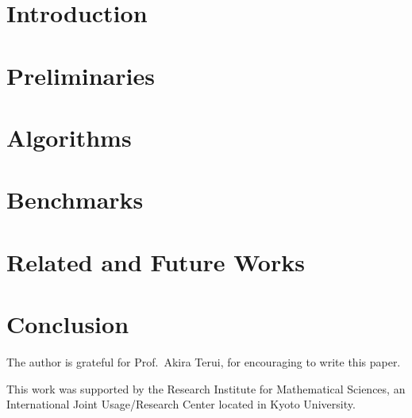 \documentclass[%
  sigconf,authorversion,screen]{acmart}
\begin{document}
\maketitle

\section{Introduction}

\section{Preliminaries}

\section{Algorithms}

\section{Benchmarks}

\section{Related and Future Works}

\section{Conclusion}

\begin{acks}
The author is grateful for Prof.\ Akira Terui, for encouraging  to write this paper.

This work was supported by the Research Institute for Mathematical Sciences,
an International Joint Usage/Research Center located in Kyoto University.
\end{acks}



\end{document}
